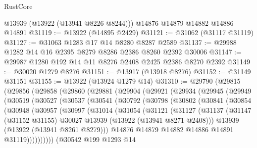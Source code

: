 \begin{lexlean}{RustCore}
\begin{coremodule}
      @13939
      (@13922 (@13941 @8226 @8244)))
    @14876
    @14879
    @14882
    @14886
    @14891
@31119 := @13922 (@14895 @2429)
@31121 := @31062 (@31117 @31119)
@31127 := @31063 @1283 @17 @14 @8280 @8287 @2589
@31137 := @29988 @1282 @14 @16 @2395 @8279 @8286 @2386 @8260 @2392 @30006
@31147 := @29987 @1280 @192 @14 @11 @8276 @2408 @2425 @2386 @8270 @2392
@31149 := @30020 @1279 @8276
@31151 := @13917 (@13918 @8276)
@31152 := @31149 @31151
@31155 := @13922 (@13924 @1279 @14)
@31310 := @29790
    (@29815
      (@29856
        (@29858
          (@29860
            (@29881
              (@29904
                (@29921
                  (@29934
                    (@29945
                      (@29949
                        (@30519
                          (@30527
                            (@30537
                              (@30541
                                (@30792
                                  (@30798
                                    (@30802
                                      (@30841
                                        (@30854
                                          (@30948
                                            (@30957
                                              (@30997
                                                (@31014
                                                  (@31054
                                                    (@31121
                                                      (@31127
                                                        (@31137
                                                          (@31147
                                                            (@31152 @31155)
                                                            @30027
                                                            @13939
                                                            (@13922 (@13941 @8271 @2408)))
                                                          @13939
                                                          (@13922 (@13941 @8261 @8279)))
                                                        @14876
                                                        @14879
                                                        @14882
                                                        @14886
                                                        @14891
                                                        @31119))))))))))
                                    (@30542
                                      @199
                                      @1293
                                      @14

\end{coremodule}
\end{lexlean}
